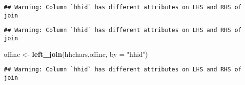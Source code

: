 \documentclass[
]{article}
\newenvironment{Shaded}{\begin{snugshade}}{\end{snugshade}}
\newcommand{\DataTypeTok}[1]{\textcolor[rgb]{0.13,0.29,0.53}{#1}}
\newcommand{\DecValTok}[1]{\textcolor[rgb]{0.00,0.00,0.81}{#1}}
\newcommand{\KeywordTok}[1]{\textcolor[rgb]{0.13,0.29,0.53}{\textbf{#1}}}
\newcommand{\NormalTok}[1]{#1}
\newcommand{\OperatorTok}[1]{\textcolor[rgb]{0.81,0.36,0.00}{\textbf{#1}}}
\newcommand{\StringTok}[1]{\textcolor[rgb]{0.31,0.60,0.02}{#1}}
\begin{document}
\begin{verbatim}
## Warning: Column `hhid` has different attributes on LHS and RHS of join
\end{verbatim}

\begin{Shaded}
\end{Shaded}

\begin{verbatim}
## Warning: Column `hhid` has different attributes on LHS and RHS of join
\end{verbatim}

\begin{Shaded}
\begin{Highlighting}[]
\NormalTok{offinc <-}\StringTok{ }\KeywordTok{left_join}\NormalTok{(hhchars,offinc,  }\DataTypeTok{by =} \StringTok{"hhid"}\NormalTok{)}
\end{Highlighting}
\end{Shaded}

\begin{verbatim}
## Warning: Column `hhid` has different attributes on LHS and RHS of join
\end{verbatim}
\end{document}
